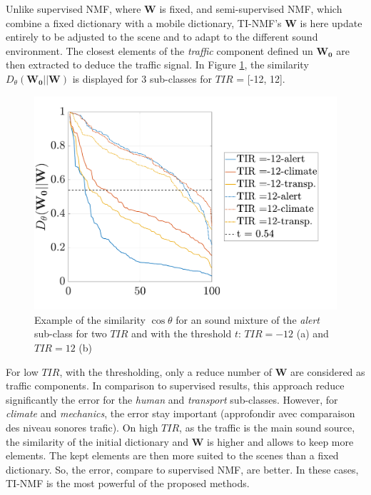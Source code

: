 \documentclass[twocolumn,a4paper,10pt]{article}
\begin{document}
Unlike supervised NMF, where $\mathbf{W}$ is fixed, and semi-supervised NMF, which combine a fixed dictionary with a mobile dictionary, TI-NMF's $\mathbf{W}$ is here update entirely to be adjusted to the scene and to adapt to the different sound environment. The closest elements of the \textit{traffic} component defined un $\mathbf{W_0}$ are then extracted to deduce the traffic signal. In Figure \ref{fig:dist_-12_12}, the similarity $D_{\theta}(\mathbf{W_0}||\mathbf{W})$ is displayed for 3 sub-classes for $TIR$ = [-12, 12].

\begin{figure}[t]
    \centering
    \includegraphics[width=\linewidth]{figures/dist_-12_12.pdf}
    \caption{Example of the similarity $\cos \theta$ for an sound mixture of the \textit{alert} sub-class for two $TIR$ and with the threshold $t$: $TIR = -12$ (a) and $TIR = 12$ (b)}
    \label{fig:dist_-12_12}
\end{figure}

For low $TIR$, with the thresholding, only a reduce number of $\mathbf{W}$ are considered as traffic components. In comparison to supervised results, this approach reduce significantly the error for the \textit{human} and \textit{transport} sub-classes.  However, for \textit{climate} and \textit{mechanics}, the error stay important (approfondir avec comparaison des niveau sonores trafic). On high $TIR$, as the traffic is the main sound source, the similarity of the initial dictionary and $\mathbf{W}$ is higher and allows to keep more elements. The kept elements are then more suited to the scenes than a fixed dictionary. So, the error, compare to supervised NMF, are better. In these cases, TI-NMF is the most powerful of the proposed methods.
\end{document}
